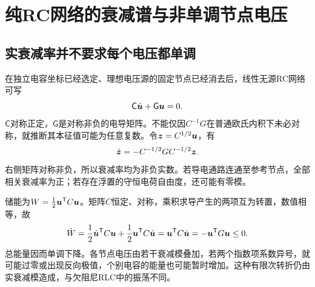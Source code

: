 \section{纯RC网络的衰减谱与非单调节点电压}
\subsection{实衰减率并不要求每个电压都单调}
在独立电容坐标已经选定、理想电压源的固定节点已经消去后，线性无源RC网络可写
\[
 \mathsf C\dot{\bm{u}}+\mathsf G\bm{u}=0.
\]
$\mathsf C$对称正定，$\mathsf G$是对称非负的电导矩阵。不能仅因$C^{-1}G$在普通欧氏内积下未必对称，就推断其本征值可能为任意复数。令$\bm{z}=C^{1/2}\bm{u}$，有
\[
 \dot{\bm{z}}=-C^{-1/2}GC^{-1/2}\bm{z}.
\]
右侧矩阵对称非负，所以衰减率均为非负实数。若导电通路连通至参考节点，全部相关衰减率为正；若存在浮置的守恒电荷自由度，还可能有零模。

储能为$W=\tfrac12\bm{u}^{\mathsf T}C\bm{u}$。矩阵$C$恒定、对称，乘积求导产生的两项互为转置，数值相等，故
\[\dot W=\frac12\dot{\bm{u}}^{\mathsf T}C\bm{u}
+\frac12\bm{u}^{\mathsf T}C\dot{\bm{u}}
=\bm{u}^{\mathsf T}C\dot{\bm{u}}
=-\bm{u}^{\mathsf T}G\bm{u}\le0.\]
总能量因而单调下降。各节点电压由若干衰减模叠加，若两个指数项系数异号，就可能过零或出现反向极值，个别电容的能量也可能暂时增加。这种有限次转折仍由实衰减模造成，与欠阻尼RLC中的振荡不同。


